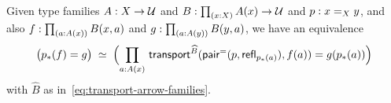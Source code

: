 \documentclass[hott-all.tex]{subfiles}
\begin{document}
%
%
\begin{lem}\label{thm:dpath-forall}
  Given type families $A:X\to\type$ and $B:\prd{x:X} A(x)\to\type$ and $p:\id[X]xy$, and also $f:\prd{a:A(x)} B(x,a)$ and $g:\prd{a:A(y)} B(y,a)$, we have an equivalence
  \[ \eqvspaced{ \big(\trans{p}{f} = {g}\big) } { \Parens{\prd{a:A(x)}  \transfib{\widehat{B}}{\pairpath(p,\refl{\trans pa})}{f(a)} = g(\trans{p}{a}) } } \]
  with $\widehat{B}$ as in~\eqref{eq:transport-arrow-families}.
\end{lem}

%
%
\end{document}
